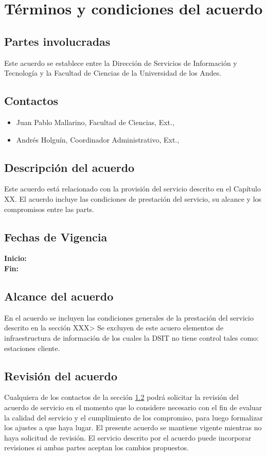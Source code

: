 \section{T\'erminos y condiciones del acuerdo}
\subsection{Partes involucradas}

Este acuerdo se establece entre la Direcci\'on de Servicios de
Informaci\'on y Tecnolog\'ia y la Facultad de Ciencias de la
Universidad de los Andes.

\subsection{Contactos}
\label{contactos}
\begin{itemize}
\item Juan Pablo Mallarino, Facultad de Ciencias, Ext., 
\item Andr\'es Holgu\'in, Coordinador Administrativo, Ext., 
\end{itemize}

\subsection{Descripci\'on del acuerdo}
Este acuerdo est\'a relacionado con la provisi\'on del servicio descrito en el Cap\'itulo XX. El acuerdo incluye las condiciones de prestaci\'on del servicio, su alcance y los compromisos entre las parts.

\subsection{Fechas de Vigencia}

{\bf Inicio:}\\

{\bf Fin:}\\


\subsection{Alcance del acuerdo}
En el acuerdo se incluyen las condiciones generales de la prestaci\'on
del servicio descrito en la secci\'on XXX> Se excluyen de este acuero
elementos de infraestructura de informaci\'on de los cuales la DSIT no
tiene control tales como: estaciones cliente. 

\subsection{Revisi\'on del acuerdo}
Cualquiera de los contactos de la secci\'on \ref{contactos} podr\'a
solicitar la revisi\'on del acuerdo de servicio en el momento que lo
considere necesario con el fin de evaluar la calidad del servicio y el
cumplimiento de los compromiso, para luego formalizar los ajustes a
que haya lugar. El presente acuerdo se mantiene vigente mientras no haya
solicitud de revisi\'on. El servicio descrito por el acuerdo puede
incorporar revisiones si ambas partes aceptan los cambios propuestos.
 
